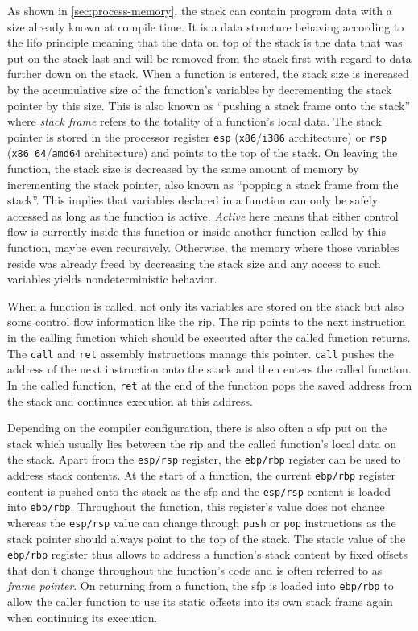 As shown in \cref{sec:process-memory}, the stack can contain program data with a size already known at compile time.
It is a data structure behaving according to the \gls{lifo} principle meaning that the data on top of the stack is the data that was put on the stack last and will be removed from the stack first with regard to data further down on the stack.
When a function is entered, the stack size is increased by the accumulative size of the function's variables by decrementing the stack pointer by this size.
This is also known as ``pushing a stack frame onto the stack'' where \emph{stack frame} refers to the totality of a function's local data.
The stack pointer is stored in the processor register \texttt{esp} (\texttt{x86}/\texttt{i386} architecture) or \texttt{rsp} (\texttt{x86\_64}/\texttt{amd64} architecture) and points to the top of the stack.
On leaving the function, the stack size is decreased by the same amount of memory by incrementing the stack pointer, also known as ``popping a stack frame from the stack''.
This implies that variables declared in a function can only be safely accessed as long as the function is active.
\emph{Active} here means that either control flow is currently inside this function or inside another function called by this function, maybe even recursively.
Otherwise, the memory where those variables reside was already freed by decreasing the stack size and any access to such variables yields nondeterministic behavior.

When a function is called, not only its variables are stored on the stack but also some control flow information like the \gls{rip}.
The \gls{rip} points to the next instruction in the calling function which should be executed after the called function returns.
The \texttt{call} and \texttt{ret} assembly instructions manage this pointer.
\texttt{call} pushes the address of the next instruction onto the stack and then enters the called function.
In the called function, \texttt{ret} at the end of the function pops the saved address from the stack and continues execution at this address.

Depending on the compiler configuration, there is also often a \gls{sfp} put on the stack which usually lies between the \gls{rip} and the called function's local data on the stack.
Apart from the \texttt{esp/rsp} register, the \texttt{ebp/rbp} register can be used to address stack contents.
At the start of a function, the current \texttt{ebp/rbp} register content is pushed onto the stack as the \gls{sfp} and the \texttt{esp/rsp} content is loaded into \texttt{ebp/rbp}.
Throughout the function, this register's value does not change whereas the \texttt{esp/rsp} value can change through \texttt{push} or \texttt{pop} instructions as the stack pointer should always point to the top of the stack.
The static value of the \texttt{ebp/rbp} register thus allows to address a function's stack content by fixed offsets that don't change throughout the function's code and is often referred to as \emph{frame pointer}.
On returning from a function, the \gls{sfp} is loaded into \texttt{ebp/rbp} to allow the caller function to use its static offsets into its own stack frame again when continuing its execution.

